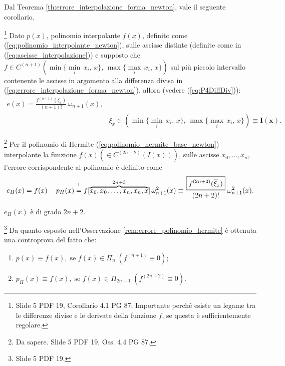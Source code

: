 
Dal Teorema \ref{th:errore_interpolazione_forma_newton}, vale il seguente corollario.

\begin{corollary}
    \footnote{Slide 5 PDF 19, Corollario 4.1 PG 87; Importante perché esiste un legame tra le differenze divise e le derivate della funzione $f$, se questa è sufficientemente regolare.}
    Dato $p(x)$, polinomio interpolante $f(x)$, definito come (\ref{eq:polinomio_interpolante_newton}), sulle ascisse distinte (definite come in (\ref{eq:ascisse_interpolazione})) e supposto che $f\in C^{(n+1)}(\min\{\underset{i}{\min}\,x_i,\,x\},\, \max\{\underset{i}{\max}\,x_i,\, x\})$ sul più piccolo intervallo contenente le ascisse in argomento alla differenza divisa in (\ref{eq:errore_interpolazione_forma_newton}), allora (vedere (\ref{eq:P4DiffDiv})):
    \begin{equation}\label{eq:errInterP4}
        \begin{matrix}
            e(x)=\frac{f^{(n+1)}(\xi_x)}{(n+1)!}\,\omega_{n+1}(x),&\\
            &\xi_x\in(\min\{\underset{i}{\min}\,x_i,\,x\},\, \max\{\underset{i}{\max}\,x_i,\, x\})\boldsymbol{\equiv I(x)}.
        \end{matrix}
    \end{equation}
\end{corollary}

\begin{remark}\label{rem:errore_polinomio_hermite}
    \footnote{Da sapere. Slide 5 PDF 19, Oss. 4.4 PG 87.}
    Per il polinomio di Hermite (\ref{eq:polinomio_hermite_base_newton}) interpolante la funzione $f(x)\left(\in C^{(2n+2)}(I(x))\right)$, sulle ascisse $x_0,\hdots,x_n$, l'errore corrispondente al polinomio è definito come
    \begin{equation}\label{eq:errPolInterHer}
        e_H(x)= f(x)-p_H(x) \overset{\footnotemark}{=} f[\overbrace{x_0,x_0,\hdots,x_n,x_n,x}^{2n+3}]\,\omega^2_{n+1}(x)\equiv\frac{\boxed{f^{(2n+2)}(\widehat\xi_x)}}{(2n+2)!}\,\omega^2_{n+1}(x).
    \end{equation}
\end{remark}
$e_H(x)$ è di grado $2n+2$.

\begin{remark}\footnote{Slide 5 PDF 19.}
    Da quanto esposto nell'Osservazione \ref{rem:errore_polinomio_hermite} è ottenuta una controprova del fatto che:
    \begin{enumerate}
        \item $p(x)\equiv f(x),\; \text{se } f(x)\in\Pi_n\; \left(f^{(n+1)}\equiv 0\right)$;
        \item $p_H(x)\equiv f(x),\; \text{se } f(x)\in\Pi_{2n+1}\; \left(f^{(2n+2)}\equiv 0\right)$.
    \end{enumerate}
\end{remark}

